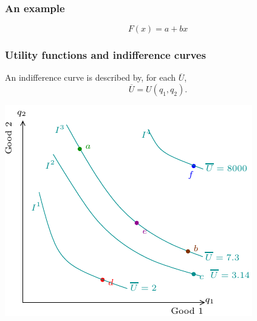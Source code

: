 \documentclass[xcolor=pdftex,dvipsnames]{beamer}
\begin{document}
\begin{frame}
\frametitle{An example}
\[
F(x) = a+bx
\]

\end{frame}
\begin{frame}
\frametitle{Utility functions and indifference curves}
An indifference curve is described by, for each $\overline U$,
\[
\overline U= U(q_1,q_2).
\]

\begin{center}
\includegraphics{pics/ICUtil}
\end{center}
\end{frame}
\end{document}
